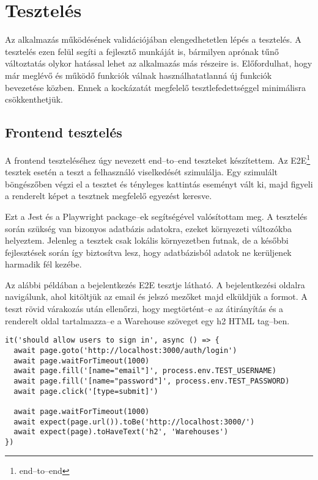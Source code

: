 \chapter{Tesztelés}

Az alkalmazás működésének validációjában elengedhetetlen lépés a tesztelés.
A tesztelés ezen felül segíti a fejlesztő munkáját is, bármilyen aprónak tűnő változtatás olykor hatással lehet az alkalmazás más részeire is.
Előfordulhat, hogy már meglévő és működő funkciók válnak használhatatlanná új funkciók bevezetése közben.
Ennek a kockázatát megfelelő tesztlefedettséggel minimálisra csökkenthetjük.

\section{Frontend tesztelés}

A frontend teszteléséhez úgy nevezett end–to–end teszteket készítettem.
Az E2E\footnote{end–to–end} tesztek esetén a teszt a felhasználó viselkedését szimulálja.
Egy szimulált böngészőben végzi el a tesztet és tényleges kattintás eseményt vált ki, majd figyeli a renderelt képet a tesztnek megfelelő egyezést keresve.

Ezt a Jest\cite{Jest} és a Playwright\cite{Playwright} package–ek segítségével valósítottam meg.
A tesztelés során szükség van bizonyos adatbázis adatokra, ezeket környezeti változókba helyeztem.
Jelenleg a tesztek csak lokális környezetben futnak, de a későbbi fejlesztések során így biztosítva lesz, hogy adatbázisból adatok ne kerüljenek harmadik fél kezébe.

Az alábbi példában a bejelentkezés E2E tesztje látható. A bejelentkezési oldalra navigálunk, ahol kitöltjük az email és jelszó mezőket majd elküldjük a formot. A teszt rövid várakozás után ellenőrzi, hogy megtörtént–e az átirányítás és a renderelt oldal tartalmazza–e a Warehouse szöveget egy h2 HTML tag–ben.

\begin{lstlisting}[style=ES6]
it('should allow users to sign in', async () => {
  await page.goto('http://localhost:3000/auth/login')
  await page.waitForTimeout(1000)
  await page.fill('[name="email"]', process.env.TEST_USERNAME)
  await page.fill('[name="password"]', process.env.TEST_PASSWORD)
  await page.click('[type=submit]')

  await page.waitForTimeout(1000)
  await expect(page.url()).toBe('http://localhost:3000/')
  await expect(page).toHaveText('h2', 'Warehouses')
})
\end{lstlisting}

